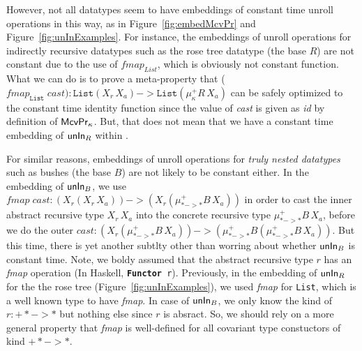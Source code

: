 However, not all datatypes seem to have embeddings of constant time 
unroll operations in this way, as in Figure~\ref{fig:embedMcvPr} and
Figure~\ref{fig:unInExamples}. For instance, the embeddings of
unroll operations for indirectly recursive datatypes such as
the rose tree datatype (the base $R$) are not constant due to the
use of $\textit{fmap}_\textit{List}$, which is obviously not constant
function. What we can do is to prove a meta-property that 
($\textit{fmap}_\texttt{List}\;\textit{cast}) : \texttt{List}(X_r\,X_a)
-> \texttt{List}(\mu^{+}_\kappa R\,X_a)$ can be safely optimized
to the constant time identity function since the value of \textit{cast}
is given as \textit{id} by definition of $\mathsf{McvPr}_\kappa$. But, that does
not mean that we have a constant time embedding of $\mathsf{unIn}_R$ within \Fixi.

For similar reasons, embeddings of unroll operations for
\emph{truly nested datatypes} \cite{AbeMatUus05} such as bushes
(the base $B$) are not likely to be constant either.
In the embedding of $\mathsf{unIn}_B$, we use
$\textit{fmap}\;\textit{cast}: (X_r(X_r\,X_a)) -> (X_r(\mu^{+}_{* -> *}B\,X_a))$
in order to cast the inner abstract recursive type $X_r\,X_a$ into
the concrete recursive type $\mu^{+}_{* -> *}B\,X_a$, before we do the outer
$\textit{cast} : (X_r(\mu^{+}_{* -> *}B\,X_a)) ->
                 (\mu^{+}_{* -> *}B(\mu^{+}_{* -> *}B\,X_a))$.
But this time, there is yet another subtlty other than worring about
whether $\mathsf{unIn}_B$ is constant time. Note, we boldy assumed that
the abstract recursive type $r$ has an \textit{fmap} operation
(In Haskell, \texttt{{\bf\ttfamily Functor} r}). Previously, in the embedding
of $\mathsf{unIn}_R$ for the the rose tree (Figure~\ref{fig:unInExamples}), we used
\textit{fmap} for \texttt{List}, which is a well known type to have
\textit{fmap}. In case of $\mathsf{unIn}_B$, we only know the kind of $r : +* -> *$
but nothing else since $r$ is absract. So, we should rely on a more general
property that \textit{fmap} is well-defined for all covariant type constuctors
of kind $+* -> *$.

